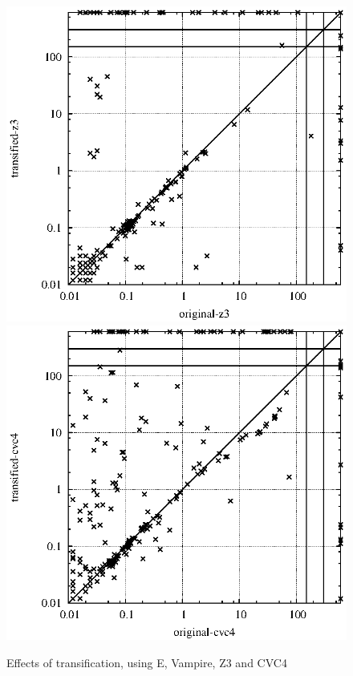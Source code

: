 \documentclass{article}
\begin{document}
\begin{figure}[t]
\begin{center}
\includegraphics[scale=0.65,trim=10mm 0mm 20mm 0mm]{Plots/OnlyTransify/Z3/test_original_z3_transified_z3_300.eps} 
\includegraphics[scale=0.65,trim=10mm 0mm 20mm 0mm]{Plots/OnlyTransify/CVC4/test_original_cvc4_transified_cvc4_300.eps}
\end{center}
\caption{Effects of transification, using E, Vampire, Z3 and CVC4 }
\end{figure}
\end{document}
